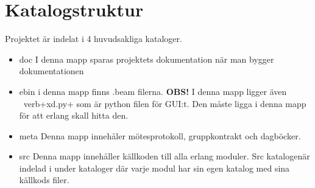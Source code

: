 
\chapter{Katalogstruktur}

\label{Katalogstruktur} 



Projektet är indelat i 4 huvudsakliga kataloger.

\begin{itemize}

\item doc     I denna mapp sparas projektets dokumentation när man bygger dokumentationen

\item ebin      i denna mapp finns .beam filerna. \textbf{OBS!} I denna mapp ligger även \ verb+xd.py+ som är python filen för GUI:t. Den måste ligga i denna mapp för att erlang skall hitta den.

\item meta    Denna mapp innehåler mötesprotokoll, gruppkontrakt och dagböcker.

\item src     Denna mapp innehåller källkoden till alla erlang moduler. Src katalogenär indelad i under kataloger där varje modul har sin egen katalog med sina källkods filer.

\end{itemize}

